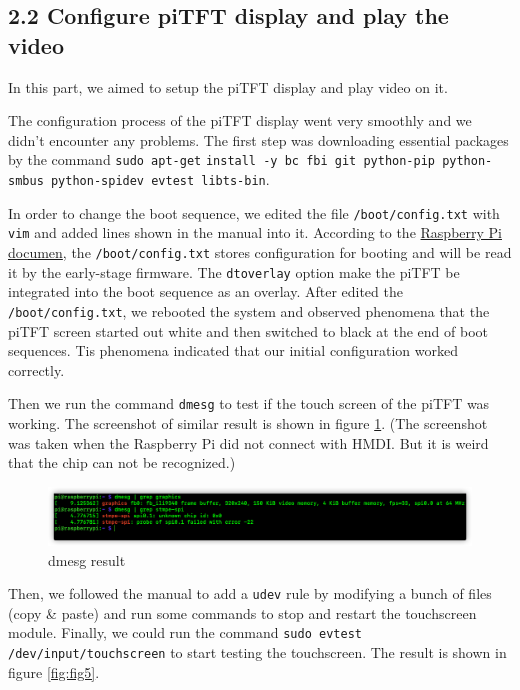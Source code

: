 \documentclass[12pt]{report}
\newcommand{\code}[1]{\colorbox{light-gray}{\texttt{#1}}}
\begin{document}
\subsection*{2.2 \quad Configure piTFT display and play the video\vspace{-1em}}
In this part, we aimed to setup the piTFT display and play video on it. \par 
The configuration process of the piTFT display went very smoothly and we didn't encounter any problems. The first step was downloading essential packages by the command \code{sudo apt-get} \code{install -y bc fbi git python-pip python-smbus python-spidev evtest libts-bin}.\par
In order to change the boot sequence, we edited the file \code{/boot/config.txt} with \code{vim} and added lines shown in the manual into it. According to the \href{https://www.raspberrypi.org/documentation/computers/config_txt.html}{Raspberry Pi documen}, the \code{/boot/config.txt} stores configuration for booting and will be read it by the early-stage firmware.  The \code{dtoverlay} option make the piTFT be integrated into the boot sequence as an overlay. After edited the \code{/boot/config.txt}, we rebooted the system and observed phenomena that the piTFT screen started out white and then switched to black at the end of boot sequences. Tis phenomena indicated that our initial configuration worked correctly.\par
Then we run the command \code{dmesg} to test if the touch screen of the piTFT was working. The screenshot of similar result is shown in figure \ref{fig:fig4}. (The screenshot was taken when the Raspberry Pi did not connect with HMDI. But it is weird that the chip can not be recognized.)\par
\begin{figure}[H]
    \includegraphics[width=16cm]{img/Figure4.png}
    \centering
    \caption{dmesg result}
    \label{fig:fig4}
\end{figure}
Then, we followed the manual to add a \code{udev} rule by modifying a bunch of files (copy \& paste) and run some commands to stop and restart the touchscreen module. Finally, we could run the command \code{sudo evtest /dev/input/touchscreen} to start testing the touchscreen. The result is shown in figure \ref{fig:fig5}.\par
\end{document}
